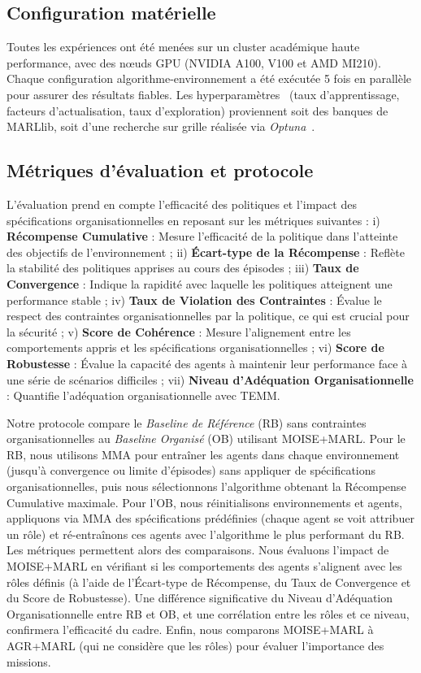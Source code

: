 \documentclass[francais,ROIA,Unicode,manuscript]{cedram}
\begin{document}
\subsection{Configuration matérielle}

Toutes les expériences ont été menées sur un cluster académique haute performance, avec des nœuds GPU (NVIDIA A100, V100 et AMD MI210). Chaque configuration algorithme-environnement a été exécutée 5 fois en parallèle pour assurer des résultats fiables.
Les hyperparamètres~\hyperref[fn:github]{\footnotemark[2]} (taux d'apprentissage, facteurs d'actualisation, taux d'exploration) proviennent soit des banques de MARLlib, soit d’une recherche sur grille réalisée via \textit{Optuna}~\cite{akiba2019optuna}.

\subsection{Métriques d'évaluation et protocole}

L'évaluation prend en compte l'efficacité des politiques et l'impact des spécifications organisationnelles en reposant sur les métriques suivantes :
%
i) \textbf{Récompense Cumulative} : Mesure l'efficacité de la politique dans l'atteinte des objectifs de l'environnement
; \quad
ii) \textbf{Écart-type de la Récompense} : Reflète la stabilité des politiques apprises au cours des épisodes
; \quad
iii) \textbf{Taux de Convergence} : Indique la rapidité avec laquelle les politiques atteignent une performance stable
; \quad
iv) \textbf{Taux de Violation des Contraintes} : Évalue le respect des contraintes organisationnelles par la politique, ce qui est crucial pour la sécurité
; \quad
v) \textbf{Score de Cohérence} : Mesure l'alignement entre les comportements appris et les spécifications organisationnelles
; \quad
vi) \textbf{Score de Robustesse} : Évalue la capacité des agents à maintenir leur performance face à une série de scénarios difficiles
; \quad
vii) \textbf{Niveau d'Adéquation Organisationnelle} : Quantifie l'adéquation organisationnelle avec TEMM.

Notre protocole compare le \textit{Baseline de Référence} (RB) sans contraintes organisationnelles au \textit{Baseline Organisé} (OB) utilisant MOISE+MARL.
Pour le RB, nous utilisons MMA pour entraîner les agents dans chaque environnement (jusqu'à convergence ou limite d'épisodes) sans appliquer de spécifications organisationnelles, puis nous sélectionnons l'algorithme obtenant la Récompense Cumulative maximale.
Pour l'OB, nous réinitialisons environnements et agents, appliquons via MMA des spécifications prédéfinies (chaque agent se voit attribuer un rôle) et ré-entraînons ces agents avec l'algorithme le plus performant du RB. Les métriques permettent alors des comparaisons.
%
Nous évaluons l'impact de MOISE+MARL en vérifiant si les comportements des agents s'alignent avec les rôles définis (à l'aide de l'Écart-type de Récompense, du Taux de Convergence et du Score de Robustesse). Une différence significative du Niveau d'Adéquation Organisationnelle entre RB et OB, et une corrélation entre les rôles et ce niveau, confirmera l'efficacité du cadre.
Enfin, nous comparons MOISE+MARL à AGR+MARL (qui ne considère que les rôles) pour évaluer l'importance des missions.
\end{document}
